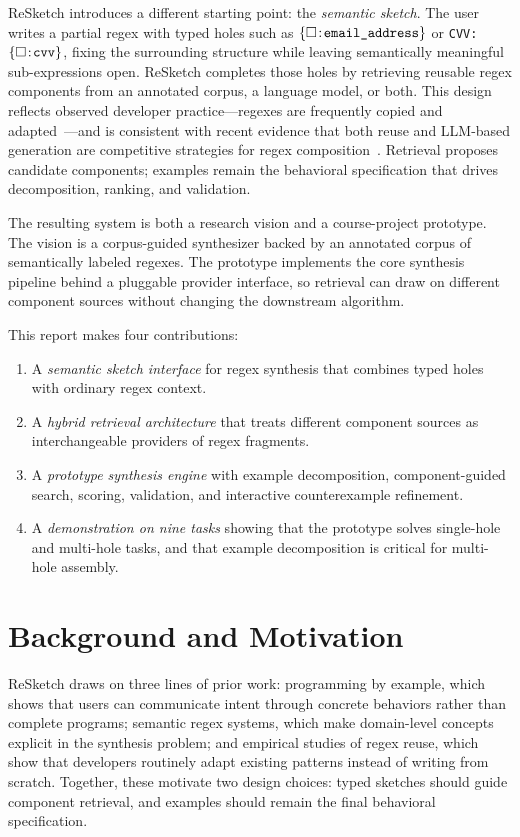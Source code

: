 \documentclass[sigconf,nonacm]{acmart}
\newcommand{\hole}[1]{\ensuremath{\{\square\!:\!\text{\texttt{#1}}\}}}
\begin{document}
ReSketch introduces a different starting point: the \emph{semantic sketch}.
The user writes a partial regex with typed holes such as
\hole{email\_address} or \texttt{CVV:}\hole{cvv}, fixing the surrounding
structure while leaving semantically meaningful sub-expressions open. ReSketch
completes those holes by retrieving reusable regex components from an annotated
corpus, a language model, or both. This design reflects observed developer
practice---regexes are frequently copied and
adapted~\cite{davis2019lingua}---and is consistent with recent evidence that
both reuse and LLM-based generation are competitive strategies for regex
composition~\cite{cakar2025reuse}. Retrieval proposes candidate components;
examples remain the behavioral specification that drives decomposition,
ranking, and validation.

The resulting system is both a research vision and a course-project prototype.
The vision is a corpus-guided synthesizer backed by an annotated corpus of
semantically labeled regexes. The prototype implements the core synthesis
pipeline behind a pluggable provider interface, so retrieval can draw on
different component sources without changing the downstream algorithm.

This report makes four contributions:
\begin{enumerate}[leftmargin=*]
  \item A \emph{semantic sketch interface} for regex synthesis that combines
  typed holes with ordinary regex context.
  \item A \emph{hybrid retrieval architecture} that treats different component
  sources as interchangeable providers of regex fragments.
  \item A \emph{prototype synthesis engine} with example decomposition,
  component-guided search, scoring, validation, and interactive counterexample
  refinement.
  \item A \emph{demonstration on nine tasks} showing that the
  prototype solves single-hole and multi-hole tasks, and that example
  decomposition is critical for multi-hole assembly.
\end{enumerate}

\section{Background and Motivation}
ReSketch draws on three lines of prior work: programming by example, which
shows that users can communicate intent through concrete behaviors rather than
complete programs; semantic regex systems, which make domain-level concepts
explicit in the synthesis problem; and empirical studies of regex reuse, which
show that developers routinely adapt existing patterns instead of writing from
scratch. Together, these motivate two design choices: typed sketches should
guide component retrieval, and examples should remain the final behavioral
specification.
\end{document}
